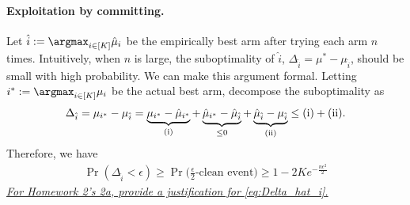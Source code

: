 \paragraph{Exploitation by committing.}
Let $\hat{i}:=\argmax_{i\in[K]} \hat{\mu}_{i}$ be the empirically best arm after trying each arm $n$ times.
Intuitively, when $n$ is large, the suboptimality of $\hat{i}$, $\Delta_{\hat{i}}=\mu^* - \mu_{\hat{i}}$, should be small with high probability.
We can make this argument formal.
Letting $i^*:=\argmax_{i\in[K]} {\mu}_{i}$ be the actual best arm, decompose the suboptimality as 
\begin{align*}
    \Delta_{\hat{i}} = 
\mu_{i^*}-\mu_{\hat{i}} =\underbrace{\mu_{i^*}-\hat{\mu}_{i^*}}_{{\rm (i)}}+\underbrace{\hat{\mu}_{i^*}-\hat{\mu}_{\hat{i}}}_{\leq 0}+\underbrace{\hat{\mu}_{\hat{i}}-\mu_{\hat{i}}}_{\rm (ii)}
\leq {\rm (i)}+{\rm (ii)}
.
\end{align*}
Therefore, we have
\begin{align}
\label{eq:Delta_hat_i}
    \Pr(\Delta_{\hat{i}}<\epsilon) \geq \Pr\big(\text{$\tfrac{\epsilon}{2}$-clean event}\big) \geq 1 - 2K e^{-\frac{n \epsilon^2}{2}}
\end{align}
\underline{\em For Homework 2's 2a, provide a justification for \eqref{eq:Delta_hat_i}.}


